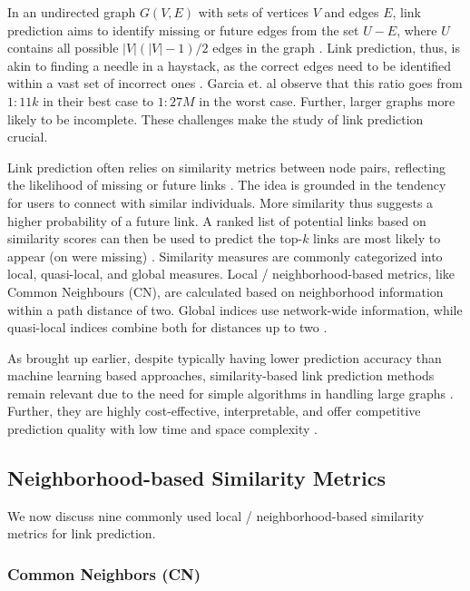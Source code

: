 In an undirected graph $G(V, E)$ with sets of vertices $V$ and edges $E$, link prediction aims to identify missing or future edges from the set $U - E$, where $U$ contains all possible $|V|(|V|-1)/2$ edges in the graph \cite{zhou2021progresses}. Link prediction, thus, is akin to finding a needle in a haystack, as the correct edges need to be identified within a vast set of incorrect ones \cite{garcia2014link, wang2014link}. Garcia et. al \cite{garcia2014link} observe that this ratio goes from $1:11k$ in their best case to $1:27M$ in the worst case. Further, larger graphs more likely to be incomplete. These challenges make the study of link prediction crucial.

Link prediction often relies on similarity metrics between node pairs, reflecting the likelihood of missing or future links \cite{wang2014link, arrar2023comprehensive}. The idea is grounded in the tendency for users to connect with similar individuals. More similarity thus suggests a higher probability of a future link. A ranked list of potential links based on similarity scores can then be used to predict the top-$k$ links are most likely to appear (on were missing) \cite{wang2014link}. Similarity measures are commonly categorized into local, quasi-local, and global measures. Local / neighborhood-based metrics, like Common Neighbours (CN), are calculated based on neighborhood information within a path distance of two. Global indices use network-wide information, while quasi-local indices combine both for distances up to two \cite{arrar2023comprehensive}.

As brought up earlier, despite typically having lower prediction accuracy than machine learning based approaches, similarity-based link prediction methods remain relevant due to the need for simple algorithms in handling large graphs \cite{garcia2014link}. Further, they are highly cost-effective, interpretable, and offer competitive prediction quality with low time and space complexity \cite{zhou2021progresses, barbieri2014follow}.




\subsection{Neighborhood-based Similarity Metrics}
\label{sec:metrics}

We now discuss nine commonly used local / neighborhood-based similarity metrics for link prediction.


\subsubsection{Common Neighbors (CN)}


